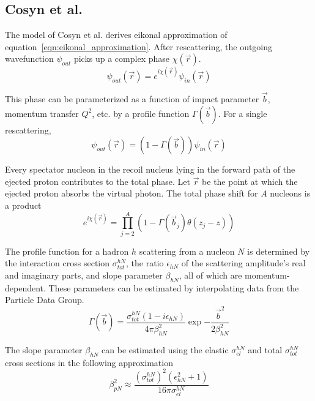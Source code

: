\subsection{Cosyn et al.}

The model of Cosyn et al. derives eikonal approximation of equation~\ref{eqn:eikonal_approximation}.
After rescattering, the outgoing wavefunction $\psi_{out}$ picks up a complex
phase $\chi(\vec{r})$.
\begin{equation}
    \psi_{out}(\vec{r}) = e^{i\chi(\vec{r})} \psi_{in}(\vec{r})
\end{equation}

This phase can be parameterized as a function of impact parameter $\vec{b}$,
momentum transfer $Q^2$, etc. by a profile function $\Gamma(\vec{b})$.
For a single rescattering,
\begin{equation}
    \psi_{out}(\vec{r}) = (1-\Gamma(\vec{b})) \psi_{in}(\vec{r})
\end{equation}

Every spectator nucleon in the recoil nucleus lying in the forward path of the
ejected proton contributes to the total phase.
Let $\vec{r}$ be the point at which the ejected proton absorbs the virtual
photon.
The total phase shift for $A$ nucleons is a product
\begin{equation}
    e^{i\chi(\vec{r})} = \prod_{j=2}^{A} \left(1-\Gamma(\vec{b}_j)\theta(z_j-z)\right)
\end{equation}

The profile function for a hadron $h$ scattering from a nucleon $N$ is
determined by
the interaction cross section $\sigma^{hN}_{tot}$,
the ratio $\epsilon_{hN}$ of the scattering amplitude's real and imaginary parts,
and slope parameter $\beta_{hN}$,
all of which are momentum-dependent.
These parameters can be estimated by interpolating data from the Particle Data
Group.
\begin{equation}
    \Gamma(\vec{b}) =
        \frac{\sigma^{hN}_{tot}(1-i\epsilon_{hN})}
             {4\pi\beta_{hN}^2}
        \exp{-\frac{\vec{b}^2}{2\beta_{hN}^2}}
\end{equation}

The slope parameter $\beta_{hN}$ can be estimated using
the elastic $\sigma^{hN}_{el}$ and total $\sigma^{hN}_{tot}$ cross sections
in the following
approximation~\cite{Ryckebusch_2003}
\begin{equation}
    \beta_{p N}^{2} \approx
            \frac{(\sigma^{hN}_{tot})^{2} (\epsilon_{hN}^{2}+1)}
                 {16 \pi \sigma^{hN}_{el}}
\end{equation}

